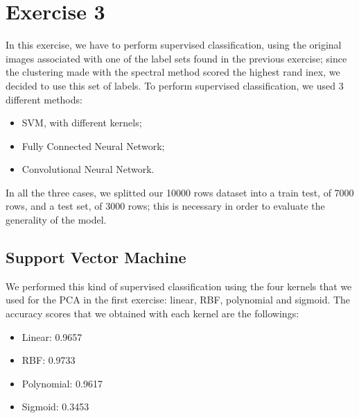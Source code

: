 \documentclass[12pt]{article}
\begin{document}
\section{Exercise 3}
In this exercise, we have to perform supervised classification, using the original images associated with one of the label sets found in the previous exercise; since the clustering made with the spectral method scored the highest rand inex, we decided to use this set of labels.\newline
To perform supervised classification, we used 3 different methods:
\begin{itemize}
	\item SVM, with different kernels;
	\item Fully Connected Neural Network;
	\item Convolutional Neural Network.
\end{itemize}
In all the three cases, we splitted our 10000 rows dataset into a train test, of 7000 rows, and a test set, of 3000 rows; this is necessary in order to evaluate the generality of the model.

\subsection{Support Vector Machine}
We performed this kind of supervised classification using the four kernels that we used for the PCA in the first exercise: linear, RBF, polynomial and sigmoid. The accuracy scores that we obtained with each kernel are the followings:
\begin{itemize}
	\item Linear: 0.9657
	\item RBF: 0.9733
	\item Polynomial: 0.9617
	\item Sigmoid: 0.3453 
\end{itemize}
\end{document}
